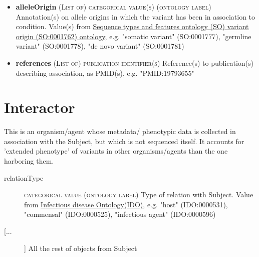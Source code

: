 \documentclass[a4paper, 10pt]{article}        %
\begin{document}
\begin{description}
\begin{itemize}
				\item[] \textbf{alleleOrigin} {\textsc{(List of) categorical value(s) (ontology label)}} Annotation(s) on allele origins in which the variant has been in association to condition. Value(s) from \href{http://purl.obolibrary.org/obo/SO_0001762}{Sequence types and features ontology (SO) variant origin (SO:0001762) ontology}, e.g. "somatic variant" (SO:0001777), "germline variant" (SO:0001778), "de novo variant" (SO:0001781)
				\item[] \textbf{references} {\textsc{(List of) publication identifier(s)}} Reference(s) to publication(s) describing association, as PMID(s), e.g. "PMID:19793655"
		 \end{itemize} 

 \end{description}
 


  
 \section*{{\color{teal} Interactor}}
This is an organism/agent whose metadata/ phenotypic data is collected in association with the Subject, but which is not sequenced itself. It accounts for 'extended phenotype' of variants in other organisms/agents than the one harboring them.
\begin{description}
	\item[relationType] {\textsc{categorical value (ontology label)}} Type of relation with Subject. Value from \href{https://www.ebi.ac.uk/ols/ontologies/ido}{Infectious disease Ontology(IDO)}, e.g. "host" (IDO:0000531), "commensal" (IDO:0000525), "infectious agent" (IDO:0000596)
	
	\item[[...]] All the rest of objects from Subject
\end{description}
 
 
\end{document}
